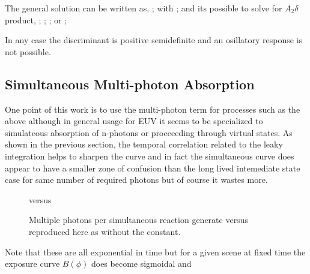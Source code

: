 The general solution can be written as, 
 ;
with 
 ;
and its possible to solve for $A_2\delta$ product,
 ;
 ;
 ;
or   
 ;

In any case the discriminant is positive semidefinite and 
an osillatory response is not possible. 




\subsection{ Simultaneous Multi-photon Absorption  }

One point of this work is to use the multi-photon term 
for processes such as the above although in general usage for
EUV it seems to be specialized to simulateous absorption
of n-photons or proceeeding through virtual states. 
As shown in the previous section, the temporal correlation 
related to the leaky integration helps to sharpen the curve
and in fact the simultaneous curve does appear to have a
smaller zone of confusion than the long lived intemediate state
case for same number of required photons but of course it
wastes more. 

\begin{figure}[htb]
\centering






versus 


\caption{ Multiple photons per simultaneous reaction  generate  versus  reproduced here as  without the constant.     }
\label{fig:simultaneous} 
\end{figure}
Note that these are all exponential in time but for a given scene
at fixed time the exposure curve $B(\phi)$ does become sigmoidal
and 

